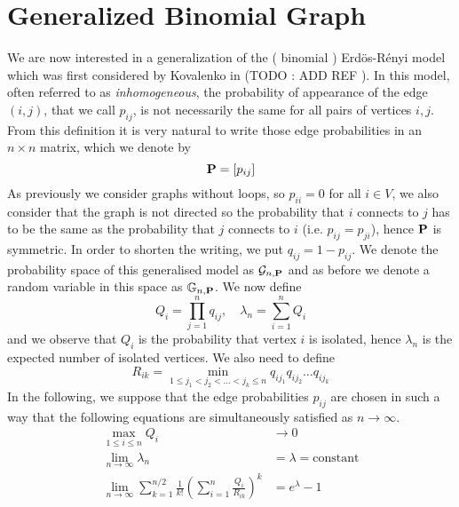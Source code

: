 \section{Generalized Binomial Graph}
We are now interested in a generalization of the ( binomial ) Erd\"os-R\'enyi model which was first considered by Kovalenko in (TODO : ADD REF ).
In this model, often referred to as \emph{inhomogeneous}, the probability of appearance of the edge $(i,j)$, that we call $p_{ij}$, is not necessarily the same for all pairs of vertices $i,j$.
\newline
From this definition it is very natural to write those edge probabilities in an $n\times n$ matrix, which we denote by
\begin{equation}
	\bold{P} = [p_{ij}]
\end{equation}
As previously we consider graphs without loops, so $p_{ii} = 0$ for all $i \in V$, we also consider that the graph is not directed so the probability that $i$ connects to $j$ has to be the same as the probability that $j$ connects to $i$ (i.e. $p_{ij} = p_{ji}$), hence $\bold{P}$ is symmetric.
In order to shorten the writing, we put $q_{ij} = 1 - p_{ij}$.
\newline
We denote the probability space of this generalised model as $\mathcal{G}_{n,\bold{P}}$ and as before we denote a random variable in this space as $\mathbb{G}_{n,\bold{P}}$.
\newline
We now define
\begin{equation}
	Q_i = \prod_{j=1}^n q_{ij}, \quad \lambda_n = \sum_{i=1}^nQ_i
\end{equation}
and we observe that $Q_i$ is the probability that vertex $i$ is isolated, hence $\lambda_n$ is the expected number of isolated vertices.
\newline
We also need to define
\begin{equation}
	R_{ik} = \min_{1\leq j_1<j_2< \ldots <j_k\leq n} q_{ij_1}q_{ij_2}\ldots q_{ij_k}
\end{equation}
In the following, we suppose that the edge probabilities $p_{ij}$ are chosen in such a way that the following equations are simultaneously satisfied as $n\to \infty$.
\begin{align}
	\max_{1\leq i \leq n} Q_i &\to 0 \label{eq:C1}\\
	\lim_{n \to \infty} \lambda_n &= \lambda = \text{constant} \label{eq:C2} \\
	\lim_{n\to \infty} \sum_{k=1}^{n/2} \frac{1}{k!}(\sum_{i=1}^n \frac{Q_i}{R_{ik}})^k &= e^{\lambda} - 1 \label{eq:C3}
\end{align}
